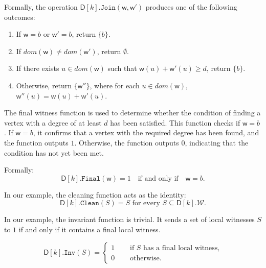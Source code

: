 \documentclass[11pt,a4paper]{article}
\newcommand{\treewidthvalue}{k}
\newcommand{\joingenericcore}{\mathtt{Join}}
\newcommand{\finalwitnessgenericcore}{\mathtt{Final}}
\newcommand{\cleaningfunctioncore}{\mathtt{Clean}}
\newcommand{\vertexone}{u}
\newcommand{\allwitnesses}{\mathcal{W}}
\newcommand{\awitness}{\mathsf{w}}
\newcommand{\dpcore}{\mathsf{D}}
\newcommand{\witnessset}{S}
\newcommand{\invariantCore}{\mathtt{Inv}}
\newcommand{\domain}{dom}
\newcommand{\maxdegreeparameter}{d}
\newcommand{\maxdegreefound}{b}
\begin{document}
{Formally, the operation $\dpcore[\treewidthvalue].\joingenericcore(\awitness,\awitness')$ produces one of the following outcomes:
\begin{enumerate}
    \item If $\awitness=\maxdegreefound$ or $\awitness' = \maxdegreefound$, return $\{\maxdegreefound\}$.
    \item If $\domain(\awitness)\neq\domain(\awitness')$, return $\emptyset$.
    \item If there exists $\vertexone  \in \domain(\awitness)$ such that $\awitness(\vertexone)+\awitness'(\vertexone)\geq \maxdegreeparameter$, return $\{\maxdegreefound\}$.
    \item Otherwise, return $\{\awitness''\}$, where for each $\vertexone  \in \domain(\awitness)$, $\awitness''(\vertexone)=\awitness(\vertexone)+\awitness'(\vertexone)$.
\end{enumerate}

The final witness function is used to determine whether the condition of finding a vertex with a degree of at least $\maxdegreeparameter$ has been satisfied. This function checks if $\awitness = \maxdegreefound$.
If $\awitness = \maxdegreefound$, it confirms that a vertex with the required degree has been found, and the function outputs $1$. Otherwise, the function outputs $0$, indicating that the condition has not yet been met.

Formally:
\[
\dpcore[\treewidthvalue].\finalwitnessgenericcore(\awitness) = 1 \quad \text{if and only if} \quad \awitness =  \maxdegreefound.
\]

 In our example, the cleaning function acts as the identity:
\[
\dpcore[\treewidthvalue].\cleaningfunctioncore(\witnessset)=\witnessset \text{ for every }
\witnessset \subseteq \dpcore[\treewidthvalue].\allwitnesses.
\]

 In our example, the invariant function is trivial. It sends a set of local witnesses $\witnessset$ to $1$ if and only if it contains a final local witness.

\[
\dpcore[\treewidthvalue].\invariantCore(\witnessset)=
\begin{cases}
1 & \quad \text{ if } \witnessset \text{ has a final local witness,} \\[6pt]
0 & \quad \text{ otherwise.}
\end{cases}
\]


}
\end{document}
